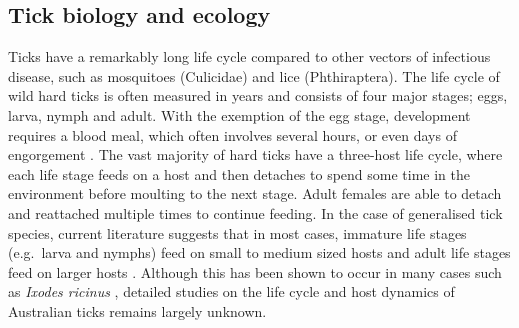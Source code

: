 \documentclass[a4paper, nobind]{templates/ociamthesis}
\begin{document}
\hypertarget{tick-biology-and-ecology}{%
\subsection{Tick biology and ecology}\label{tick-biology-and-ecology}}

Ticks have a remarkably long life cycle compared to other vectors of infectious disease, such as mosquitoes (Culicidae) and lice (Phthiraptera).
The life cycle of wild hard ticks is often measured in years and consists of four major stages; eggs, larva, nymph and adult.
With the exemption of the egg stage, development requires a blood meal, which often involves several hours, or even days of engorgement \autocite{cuppBiologyTicks1991}.
The vast majority of hard ticks have a three-host life cycle, where each life stage feeds on a host and then detaches to spend some time in the environment before moulting to the next stage.
Adult females are able to detach and reattached multiple times to continue feeding.
In the case of generalised tick species, current literature suggests that in most cases, immature life stages (e.g.~larva and nymphs) feed on small to medium sized hosts and adult life stages feed on larger hosts \autocite{oliverBiologySystematicsTicks1989}.
Although this has been shown to occur in many cases such as \emph{Ixodes ricinus} \autocite{krasnovHostCommunityStructure2007}, detailed studies on the life cycle and host dynamics of Australian ticks remains largely unknown.
\end{document}
